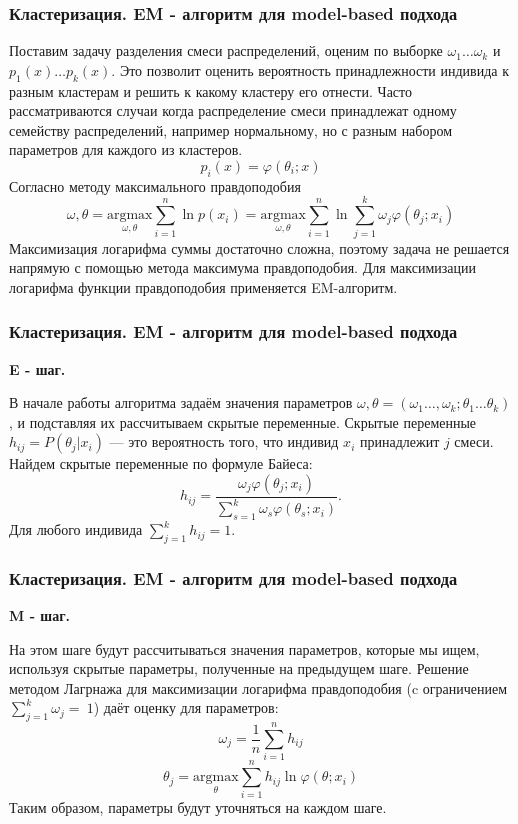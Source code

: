 \documentclass[notheorems, handout]{beamer}
\begin{document}
	\begin{frame}
	\frametitle{Кластеризация. EM - алгоритм для model-based подхода}
		
		Поставим задачу разделения смеси распределений, оценим по выборке $\omega_{1}\ldots \omega_{k}$ и $p_{1}(x)\ldots p_{k}(x)$. Это позволит оценить вероятность принадлежности индивида к разным кластерам и решить к какому кластеру его отнести. Часто рассматриваются случаи когда распределение смеси принадлежат одному семейству распределений, например нормальному, но с разным набором параметров для каждого из кластеров. 
		$$
		p_{i}(x) = \varphi(\theta_{i}; x)
		$$
		Согласно методу максимального правдоподобия 
		$$
		\omega, \theta = \underset{\omega, \theta}{\text{argmax}} \sum\limits_{i=1}^n \ln{p(x_{i})}  =  \underset{\omega, \theta}{\text{argmax}} \sum\limits_{i=1}^n \ln  \sum\limits_{j=1}^k \omega_{j}  \varphi(\theta_{j}; x_{i})
		$$
		Максимизация логарифма суммы достаточно сложна, поэтому задача не решается напрямую с помощью метода максимума правдоподобия. Для максимизации логарифма функции правдоподобия применяется EM-алгоритм.
	\end{frame}
	
	\begin{frame}
	\frametitle{Кластеризация. EM - алгоритм для model-based подхода}
		
		\textbf{E - шаг.}
		
		В начале работы алгоритма задаём значения параметров $\omega, \theta = (\omega_{1}\ldots, \omega_{k};\theta_{1}\ldots \theta_{k})$, и подставляя их рассчитываем скрытые переменные. Скрытые переменные $h_{ij} = P(\theta_{j}|x_{i})$ --- это вероятность того, что индивид $x_{i}$ принадлежит $j$ смеси. Найдем скрытые переменные по формуле Байеса:
		$$
		h_{ij} = \frac{ \omega_{j} \varphi(\theta_{j}; x_{i})}{\sum\limits_{s=1}^k \omega_{s}  \varphi(\theta_{s}; x_{i})}.
		$$
		Для любого индивида $\sum\limits_{j=1}^k h_{ij} = 1.$
	\end{frame}
	
	\begin{frame}
	\frametitle{Кластеризация. EM - алгоритм для model-based подхода}
		
		\textbf{M - шаг.}

		На этом шаге будут рассчитываться значения параметров, которые мы ищем, используя скрытые параметры, полученные на предыдущем шаге. Решение методом Лагрнажа для максимизации логарифма правдоподобия (c ограничением $\sum\limits_{j=1}^k\omega_{j}=~1$) даёт оценку для параметров:
		$$
		\omega_{j} = \frac{1}{n} \sum\limits_{i=1}^n h_{ij}
		$$
		$$
		\theta_{j} = \underset{\theta}{\text{argmax}} \sum\limits_{i=1}^n h_{ij} \ln{\varphi(\theta; x_{i})}
		$$
		Таким образом, параметры будут уточняться на каждом шаге.
	\end{frame}
	
\end{document}
